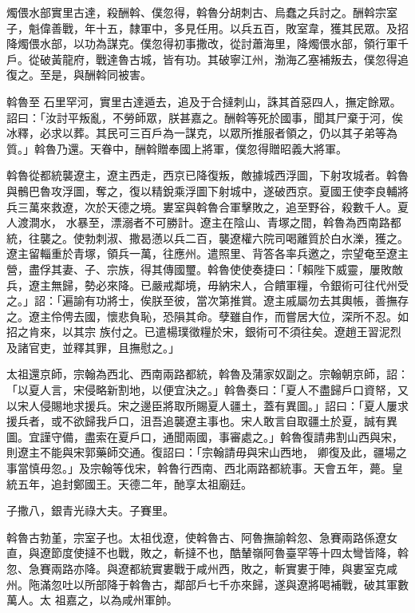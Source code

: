 \begin{pinyinscope}
 燭偎水部實里古達，殺酬斡、僕忽得，斡魯分胡刺古、烏蠢之兵討之。酬斡宗室子，魁偉善戰，年十五，隸軍中，多見任用。以兵五百，敗室韋，獲其民眾。及招降燭偎水部，以功為謀克。僕忽得初事撒改，從討蕭海里，降燭偎水部，領行軍千戶。從破黃龍府，戰達魯古城，皆有功。其破寧江州，渤海乙塞補叛去，僕忽得追復之。至是，與酬斡同被害。



 斡魯至
 石里罕河，實里古達遁去，追及于合撻刺山，誅其首惡四人，撫定餘眾。詔曰：「汝討平叛亂，不勞師眾，朕甚嘉之。酬斡等死於國事，聞其尸棄于河，俟冰釋，必求以葬。其民可三百戶為一謀克，以眾所推服者領之，仍以其子弟等為質。」斡魯乃還。天眷中，酬斡贈奉國上將軍，僕忽得贈昭義大將軍。



 斡魯從都統襲遼主，遼主西走，西京已降復叛，敵據城西浮圖，下射攻城者。斡魯與鶻巴魯攻浮圖，奪之，復以精銳乘浮圖下射城中，遂破西京。夏國王使李良輔將兵三萬來救遼，次於天德之境。婁室與斡魯合軍擊敗之，追至野谷，殺數千人。夏人渡澗水，
 水暴至，漂溺者不可勝計。遼主在陰山、青塚之間，斡魯為西南路都統，往襲之。使勃刺淑、撒曷懣以兵二百，襲遼權六院司喝離質於白水濼，獲之。遼主留輜重於青塚，領兵一萬，往應州。遣照里、背答各率兵邀之，宗望奄至遼主營，盡俘其妻、子、宗族，得其傳國璽。斡魯使使奏捷曰：「賴陛下威靈，屢敗敵兵，遼主無歸，勢必來降。已嚴戒鄰境，毋納宋人，合饋軍糧，令銀術可往代州受之。」詔：「遍諭有功將士，俟朕至彼，當次第推賞。遼主戚屬勿去其輿帳，善撫存之。遼主伶俜去國，懷悲負恥，恐隕其命。孽雖自作，而嘗居大位，深所不忍。如招之肯來，以其宗
 族付之。已遣楊璞徵糧於宋，銀術可不須往矣。遼趙王習泥烈及諸官吏，並釋其罪，且撫慰之。」



 太祖還京師，宗翰為西北、西南兩路都統，斡魯及蒲家奴副之。宗翰朝京師，詔：「以夏人言，宋侵略新割地，以便宜決之。」斡魯奏曰：「夏人不盡歸戶口資帑，又以宋人侵賜地求援兵。宋之邊臣將取所賜夏人疆土，蓋有異圖。」詔曰：「夏人屢求援兵者，或不欲歸我戶口，沮吾追襲遼主事也。宋人敢言自取疆土於夏，誠有異圖。宜謹守備，盡索在夏戶口，通聞兩國，事審處之。」斡魯復請弗割山西與宋，則遼主不能與宋郭藥師交通。復詔曰：「宗翰請毋與宋山西地，
 卿復及此，疆場之事當慎毋忽。」及宗翰等伐宋，斡魯行西南、西北兩路都統事。天會五年，薨。皇統五年，追封鄭國王。天德二年，酏享太祖廟廷。



 子撒八，銀青光祿大夫。子賽里。



 斡魯古勃堇，宗室子也。太祖伐遼，使斡魯古、阿魯撫諭斡忽、急賽兩路係遼女直，與遼節度使撻不也戰，敗之，斬撻不也，酷輦嶺阿魯臺罕等十四太彎皆降，斡忽、急賽兩路亦降。與遼都統實婁戰于咸州西，敗之，斬實婁于陣，與婁室克咸州。陁滿忽吐以所部降于斡魯古，鄰部戶七千亦來歸，遂與遼將喝補戰，破其軍數萬人。太
 祖嘉之，以為咸州軍帥。




\end{pinyinscope}
